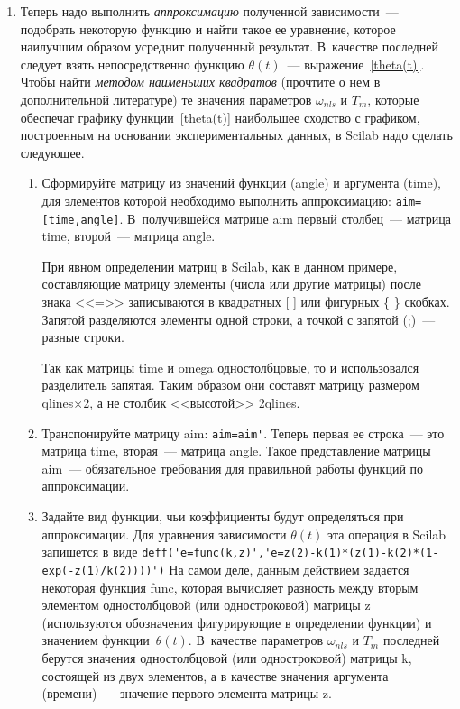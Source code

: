 \documentclass[12pt,a4paper,openany]{extarticle}
\begin{document}
\begin{enumerate}
\begin{enumerate}
\item Теперь надо выполнить \textit{аппроксимацию} полученной зависимости~--- подобрать некоторую функцию и найти такое ее уравнение, которое наилучшим образом усреднит полученный результат. 
В~качестве последней следует взять непосредственно функцию $\theta(t)$~--- выражение~\eqref{theta(t)}. 
Чтобы найти \textit{методом наименьших квадратов} (прочтите о нем в дополнительной литературе) те значения параметров $\omega_{nls}$ и $T_m$, которые обеспечат графику функции~\eqref{theta(t)} наибольшее сходство с графиком, построенным на основании экспериментальных данных, в Scilab надо сделать следующее.
\begin{enumerate}
\item Сформируйте матрицу из значений функции (angle) и аргумента (time), для элементов которой необходимо выполнить аппроксимацию: \verb|aim=[time,angle]|. 
В~получившейся матрице aim первый столбец~--- матрица time, второй~--- матрица angle.

При явном определении матриц в Scilab, как в данном примере, составляющие матрицу элементы (числа или другие матрицы) после знака <<=>> записываются в квадратных [ ] или фигурных \{ \} скобках. 
Запятой разделяются элементы одной строки, а точкой с запятой (;)~--- разные строки. 

Так как матрицы time и omega одностолбцовые, то и использовался разделитель запятая. 
Таким образом они составят матрицу размером qlines$\times$2, а не столбик <<высотой>> 2qlines.
\item Транспонируйте матрицу aim: \verb|aim=aim'|.
Теперь первая ее строка~--- это матрица time, вторая~--- матрица angle. 
Такое представление матрицы aim~--- обязательное требования для правильной работы функций по аппроксимации.
\item Задайте вид функции, чьи коэффициенты будут определяться при аппроксимации. 
Для уравнения зависимости $\theta(t)$ эта операция в Scilab запишется в виде \verb|deff('e=func(k,z)','e=z(2)-k(1)*(z(1)-k(2)*(1-exp(-z(1)/k(2))))')|
На самом деле, данным действием задается некоторая функция func, которая вычисляет разность между вторым элементом одностолбцовой (или одностроковой) матрицы z (используются обозначения фигурирующие в определении функции) и значением функции~$\theta(t)$.
В~качестве параметров $\omega_{nls}$ и $T_m$ последней берутся значения одностолбцовой (или одностроковой) матрицы k, состоящей из двух элементов, а в качестве значения аргумента (времени)~--- значение первого элемента матрицы z. 


\end{enumerate}
\end{enumerate}
\end{enumerate}
\end{document}

